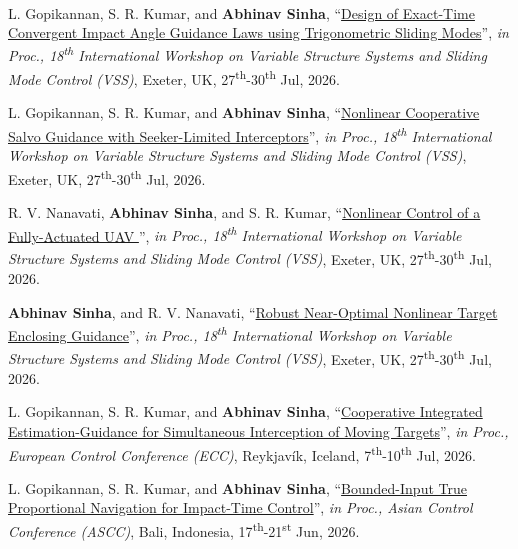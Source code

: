 \\
{\renewcommand{\labelenumi}{[\textbf{C\arabic{enumi}}]}
	\begin{etaremune}[leftmargin=1cm]
		
		
		\item L. Gopikannan, S. R. Kumar, and \textbf{Abhinav Sinha}, ``\href{}{Design of Exact-Time Convergent Impact Angle Guidance Laws using Trigonometric Sliding Modes}'', \emph{in Proc., 18\textsuperscript{th} International Workshop on Variable Structure Systems and Sliding Mode Control (VSS)}, Exeter, UK, 27\textsuperscript{th}-30\textsuperscript{th} Jul, 2026.
		\item L. Gopikannan, S. R. Kumar, and \textbf{Abhinav Sinha}, ``\href{}{Nonlinear Cooperative Salvo Guidance with Seeker-Limited Interceptors}'', \emph{in Proc., 18\textsuperscript{th} International Workshop on Variable Structure Systems and Sliding Mode Control (VSS)}, Exeter, UK, 27\textsuperscript{th}-30\textsuperscript{th} Jul, 2026.
		\item R. V. Nanavati, \textbf{Abhinav Sinha}, and S. R. Kumar, ``\href{}{Nonlinear Control of a Fully-Actuated UAV  }'', \emph{in Proc., 18\textsuperscript{th} International Workshop on Variable Structure Systems and Sliding Mode Control (VSS)}, Exeter, UK, 27\textsuperscript{th}-30\textsuperscript{th} Jul, 2026.
		\item \textbf{Abhinav Sinha}, and R. V. Nanavati, ``\href{}{Robust Near-Optimal Nonlinear Target Enclosing Guidance}'', \emph{in Proc., 18\textsuperscript{th} International Workshop on Variable Structure Systems and Sliding Mode Control (VSS)}, Exeter, UK, 27\textsuperscript{th}-30\textsuperscript{th} Jul, 2026.
		
		\item L. Gopikannan, S. R. Kumar, and \textbf{Abhinav Sinha}, ``\href{}{Cooperative Integrated Estimation-Guidance for Simultaneous Interception of Moving Targets}'', \emph{in Proc., European Control Conference (ECC)}, Reykjavík, Iceland, 7\textsuperscript{th}-10\textsuperscript{th} Jul, 2026.
			\item L. Gopikannan, S. R. Kumar, and \textbf{Abhinav Sinha}, ``\href{}{Bounded-Input True Proportional Navigation for Impact-Time Control}'', \emph{in Proc., Asian Control Conference (ASCC)}, Bali, Indonesia, 17\textsuperscript{th}-21\textsuperscript{st} Jun, 2026.
		

\end{etaremune}}
